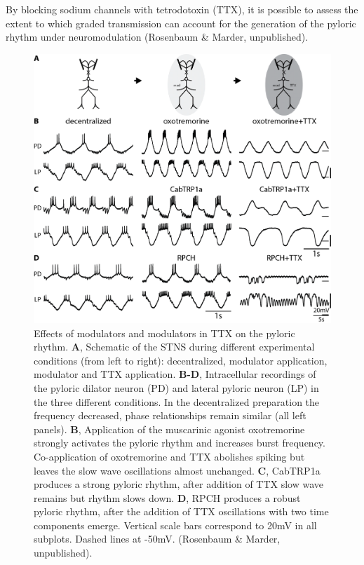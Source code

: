 \documentclass[14pt]{article}
\begin{document}
	By blocking sodium channels with tetrodotoxin (TTX), it is possible to assess the extent to which graded transmission can account for the generation of the pyloric rhythm under neuromodulation (Rosenbaum \& Marder, unpublished).
	\begin{figure}
		\centering
		\includegraphics[width=0.5\textheight]{Rosenbaum2017Fig2}
		\caption{Effects of modulators and modulators in TTX on the pyloric rhythm. \textbf{A}, Schematic of the STNS during different experimental conditions (from left to right): decentralized, modulator application, modulator and TTX application. \textbf{B-D}, Intracellular recordings of the pyloric dilator neuron (PD) and lateral pyloric neuron (LP) in the three different conditions. In the decentralized preparation the frequency decreased, phase relationships remain similar (all left panels). \textbf{B}, Application of the muscarinic agonist oxotremorine strongly activates the pyloric rhythm and increases burst frequency. Co-application of oxotremorine and TTX abolishes spiking but leaves the slow wave oscillations almost unchanged. \textbf{C}, CabTRP1a produces a strong pyloric rhythm, after addition of TTX slow wave remains but rhythm slows down. \textbf{D}, RPCH produces a robust pyloric rhythm, after the addition of TTX oscillations with two time components emerge. Vertical scale bars correspond to 20mV in all subplots. Dashed lines at -50mV. (Rosenbaum \& Marder, unpublished).}
	\end{figure}
\end{document}
